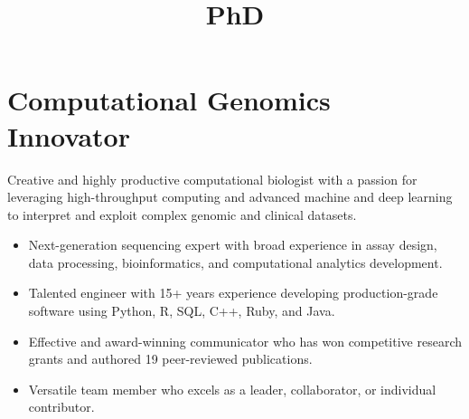 \documentclass[11pt,letter,sans]{moderncv}
\title{PhD}
\newenvironment{mypar}
    {\setlength{\parskip}{0.5em}}
    {}
\begin{document}
\makecvtitle
    
\section{Computational Genomics Innovator}


\begin{mypar}
Creative and highly productive computational biologist with a passion for leveraging high-throughput computing and advanced machine and deep learning to interpret and exploit complex genomic and clinical datasets.
\end{mypar}

\begin{itemize}
\item {Next-generation sequencing expert with broad experience in assay design, data processing, bioinformatics, and computational analytics development.}
\item {Talented engineer with 15+ years experience developing production-grade software using Python, R, SQL, C++, Ruby, and Java.}
\item {Effective and award-winning communicator who has won competitive research grants and authored 19 peer-reviewed publications.}
\item {Versatile team member who excels as a leader, collaborator, or individual contributor.}
\end{itemize}
\end{document}
